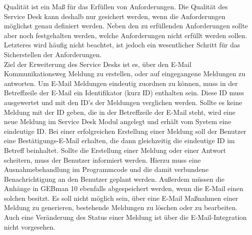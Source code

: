 \noindent
Qualität ist ein Maß für das Erfüllen von Anforderungen. Die Qualität des Service Desk kann deshalb nur gesichert werden, wenn die Anforderungen möglichst genau definiert werden. Neben den zu erfüllenden Anforderungen sollte aber noch festgehalten werden, welche Anforderungen nicht erfüllt werden sollen. Letzteres wird häufig nicht beachtet, ist jedoch ein wesentlicher Schritt für das Sicherstellen der Anforderungen.\\
\noindent
Ziel der Erweiterung des Service Desks ist es, über den E-Mail Kommunikationsweg Meldung zu erstellen, oder auf eingegangene Meldungen zu antworten. Um E-Mail Meldungen eindeutig zuordnen zu können, muss in der Betreffzeile der E-Mail ein Identifikator (kurz ID) enthalten sein. Diese ID muss ausgewertet und mit den ID's der Meldungen verglichen werden. Sollte es keine Meldung mit der ID geben, die in der Betreffzeile der E-Mail steht, wird eine neue Meldung im Service Desk Modul angelegt und erhält vom System eine eindeutige ID. Bei einer erfolgreichen Erstellung einer Meldung soll der Benutzer eine Bestätigungs-E-Mail erhalten, die dann gleichzeitig die eindeutige ID im Betreff beinhaltet. Sollte die Erstellung einer Meldung oder einer Antwort scheitern, muss der Benutzer informiert werden. Hierzu muss eine Ausnahmebehandlung im Programmcode und die damit verbundene Benachrichtigung an den Benutzer geplant werden. Außerdem müssen die Anhänge in GEBman 10 ebenfalls abgespeichert werden, wenn die E-Mail einen solchen besitzt. \newline
Es soll nicht möglich sein, über eine E-Mail Maßnahmen einer Meldung zu generieren, bestehende Meldungen zu löschen oder zu bearbeiten. Auch eine Veränderung des Status einer Meldung ist über die E-Mail-Integration nicht vorgesehen.

